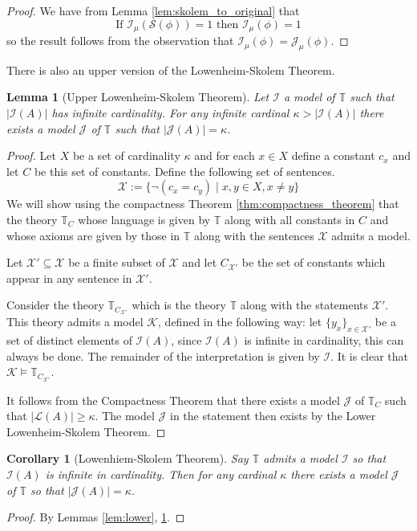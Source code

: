 \documentclass[12pt]{article}
\theoremstyle{plain}
\newtheorem{lemma}[thm]{Lemma}
\newtheorem{cor}[thm]{Corollary}
\theoremstyle{definition}
\newcommand{\bb}[1]{\mathbb{#1}}
\newcommand{\scr}[1]{\mathscr{#1}}
\newcommand{\call}[1]{\mathcal{#1}}
\begin{document}
\begin{proof}
We have from Lemma \ref{lem:skolem_to_original} that
\begin{equation}
	\text{If }\call{I}_\mu(\call{S}(\phi)) = 1\text{ then }\call{I}_\mu(\phi) = 1
	\end{equation}
so the result follows from the observation that $\call{I}_\mu(\phi) = \call{J}_\mu(\phi)$.
	\end{proof}
There is also an upper version of the Lowenheim-Skolem Theorem.
	\begin{lemma}[Upper Lowenheim-Skolem Theorem]\label{lem:upper}
		Let $\call{I}$ a model of $\bb{T}$ such that $|\call{I}(A)|$ has infinite cardinality. For any infinite cardinal $\kappa > |\call{I}(A)|$ there exists a model $\call{J}$ of $\bb{T}$ such that $|\call{J}(A)| = \kappa$.
		\end{lemma}
	\begin{proof}
		Let $X$ be a set of cardinality $\kappa$ and for each $x \in X$ define a constant $c_x$ and let $C$ be this set of constants. Define the following set of sentences.
		\begin{equation}
			\scr{X} := \{ \neg(c_x = c_y) \mid x,y \in X, x \neq y \}
			\end{equation}
		We will show using the compactness Theorem \ref{thm:compactness_theorem} that the theory $\bb{T}_C$ whose language is given by $\bb{T}$ along with all constants in $C$ and whose axioms are given by those in $\bb{T}$ along with the sentences $\scr{X}$ admits a model.
		
		Let $\scr{X}' \subseteq \scr{X}$ be a finite subset of $\scr{X}$ and let $C_{\scr{X}'}$ be the set of constants which appear in any sentence in $\scr{X}'$.
		
		Consider the theory $\bb{T}_{C_{\scr{X}'}}$ which is the theory $\bb{T}$ along with the statements $\scr{X}'$. This theory admits a model $\call{K}$, defined in the following way: let $\{ y_x \}_{x \in \scr{X}'}$ be a set of distinct elements of $\call{I}(A)$, since $\call{I}(A)$ is infinite in cardinality, this can always be done. The remainder of the interpretation is given by $\call{I}$. It is clear that $\call{K} \models \bb{T}_{C_{\scr{X}'}}$.
		
		It follows from the Compactness Theorem that there exists a model $\call{J}$ of $\bb{T}_C$ such that $|\call{L}(A)| \geq \kappa$. The model $\call{J}$ in the statement then exists by the Lower Lowenheim-Skolem Theorem.
		\end{proof}
	\begin{cor}[Lowenhiem-Skolem Theorem]
		Say $\bb{T}$ admits a model $\call{I}$ so that $\call{I}(A)$ is infinite in cardinality. Then for any cardinal $\kappa$ there exists a model $\call{J}$ of $\bb{T}$ so that $|\call{J}(A)| = \kappa$.
		\end{cor}
	\begin{proof}
		By Lemmas \ref{lem:lower}, \ref{lem:upper}.
		\end{proof}
	
\end{document}
